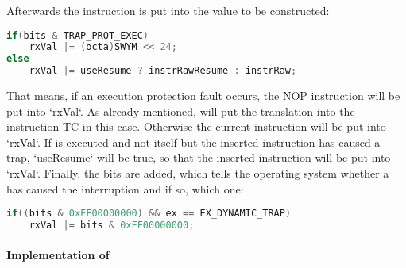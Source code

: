 Afterwards the instruction is put into the value to be constructed:
\begin{lstlisting}[language=C,caption={Determining \sr{X}/\sr{XX} in {\tt cpu\_triggerException}, part 2}]
if(bits & TRAP_PROT_EXEC)
	rxVal |= (octa)SWYM << 24;
else
	rxVal |= useResume ? instrRawResume : instrRaw;
\end{lstlisting}
That means, if an execution protection fault occurs, the NOP instruction  will be put into `rxVal`. As already mentioned,  will put the translation into the instruction TC in this case. Otherwise the current instruction will be put into `rxVal`. If  is executed and not  itself but the inserted instruction has caused a trap, `useResume` will be true, so that the inserted instruction will be put into `rxVal`. Finally, the  bits are added, which tells the operating system whether a  has caused the interruption and if so, which one:
\begin{lstlisting}[language=C,caption={Determining \sr{X}/\sr{XX} in {\tt cpu\_triggerException}, part 3}]
if((bits & 0xFF00000000) && ex == EX_DYNAMIC_TRAP)
	rxVal |= bits & 0xFF00000000;
\end{lstlisting}

\paragraph{Implementation of }

